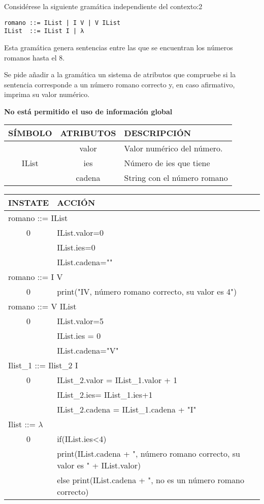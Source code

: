\begin{problem}[5]
Considérese la siguiente gramática independiente del contexto:2
\begin{verbatim}
romano ::= IList | I V | V IList
IList  ::= IList I | λ
\end{verbatim}
Esta gramática genera sentencias entre las que se encuentran los números romanos hasta el 8.

Se pide añadir a la gramática un sistema de atributos que compruebe si la sentencia corresponde a un número romano correcto y, en caso afirmativo, imprima su valor numérico.

\textbf{No está permitido el uso de información global}
\solution

\begin{tabular}{|c|c|l|}
\hline
SÍMBOLO & ATRIBUTOS & DESCRIPCIÓN \\
\hline
 & valor & Valor numérico del número. \\
\cline{2-3}
IList & ies & Número de ies que tiene \\
\cline{2-3}
 & cadena & String con el número romano \\
\hline
 
\end{tabular}

\begin{tabular}{|c|l|}
\hline
INSTATE & ACCIÓN \\
\hline
\multicolumn{2}{|l|}{romano ::= IList} \\
\hline
 0 & IList.valor=0\\ & IList.ies=0 \\ & IList.cadena=""\\
 \hline
\multicolumn{2}{|l|}{romano ::= I V} \\
\hline
 0 & print("IV, número romano correcto, su valor es 4")\\
\hline
\multicolumn{2}{|l|}{romano ::= V IList} \\
\hline
 0 & IList.valor=5\\ &  IList.ies = 0\\ & IList.cadena="V"\\
\hline
\multicolumn{2}{|l|}{Ilist\_1 ::= Ilist\_2 I}\\
\hline
 0 & IList\_2.valor = IList\_1.valor + 1\\ & IList\_2.ies= IList\_1.ies+1\\ & IList\_2.cadena = IList\_1.cadena + "I"\\
\hline
\multicolumn{2}{|l|}{Ilist ::= $\lambda$}\\
\hline
0 & if(IList.ies<4) \\& print(IList.cadena + ", número romano correcto, su valor es " + IList.valor) \\ & else print(IList.cadena + ", no es un número romano correcto)\\
\hline


\end{tabular}

\end{problem}

